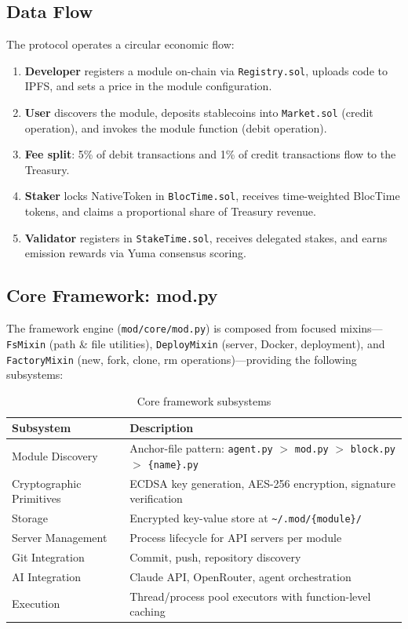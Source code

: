 \documentclass[11pt,a4paper]{article}
\begin{document}
\subsection{Data Flow}

The protocol operates a circular economic flow:

\begin{enumerate}
    \item \textbf{Developer} registers a module on-chain via \texttt{Registry.sol}, uploads code to IPFS, and sets a price in the module configuration.
    \item \textbf{User} discovers the module, deposits stablecoins into \texttt{Market.sol} (credit operation), and invokes the module function (debit operation).
    \item \textbf{Fee split}: 5\% of debit transactions and 1\% of credit transactions flow to the Treasury.
    \item \textbf{Staker} locks NativeToken in \texttt{BlocTime.sol}, receives time-weighted BlocTime tokens, and claims a proportional share of Treasury revenue.
    \item \textbf{Validator} registers in \texttt{StakeTime.sol}, receives delegated stakes, and earns emission rewards via Yuma consensus scoring.
\end{enumerate}

\subsection{Core Framework: mod.py}

The framework engine (\texttt{mod/core/mod.py}) is composed from focused mixins---\texttt{FsMixin} (path \& file utilities), \texttt{DeployMixin} (server, Docker, deployment), and \texttt{FactoryMixin} (new, fork, clone, rm operations)---providing the following subsystems:

\begin{table}[H]
\centering
\begin{tabularx}{\textwidth}{lX}
\toprule
\textbf{Subsystem} & \textbf{Description} \\
\midrule
Module Discovery & Anchor-file pattern: \texttt{agent.py} $>$ \texttt{mod.py} $>$ \texttt{block.py} $>$ \texttt{\{name\}.py} \\
Cryptographic Primitives & ECDSA key generation, AES-256 encryption, signature verification \\
Storage & Encrypted key-value store at \texttt{\textasciitilde/.mod/\{module\}/} \\
Server Management & Process lifecycle for API servers per module \\
Git Integration & Commit, push, repository discovery \\
AI Integration & Claude API, OpenRouter, agent orchestration \\
Execution & Thread/process pool executors with function-level caching \\
\bottomrule
\end{tabularx}
\caption{Core framework subsystems}
\end{table}
\end{document}
